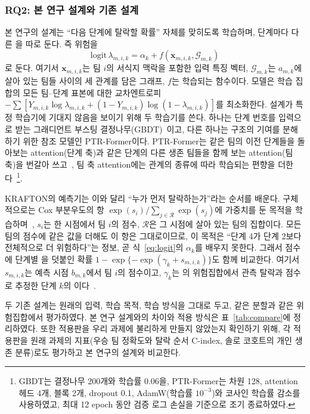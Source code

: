 \subsubsection{RQ2: 본 연구 설계와 기존 설계}
\label{sec:method:rq2}
본 연구의 설계는 “다음 단계에 탈락할 확률” 자체를 맞히도록 학습하며, 단계마다 다른 을 따로 둔다.
즉 위험을
\begin{equation}
\mathrm{logit}\,\lambda_{m,i,k}=\alpha_k+f(\mathbf{x}_{m,i,k},\mathcal{G}_{m,k})
\label{eq:logit}
\end{equation}
로 둔다. 여기서 $\mathbf{x}_{m,i,k}$는 팀 $i$의 서식지 맥락을 포함한 입력 특징 벡터, $\mathcal{G}_{m,k}$는 $a_{m,k}$에 살아 있는 팀들 사이의 세 관계를 담은 그래프, $f$는 학습되는 함수이다.
모델은 학습 집합의 모든 팀--단계 표본에 대한 교차엔트로피 $-\sum[Y_{m,i,k}\log\lambda_{m,i,k}+(1-Y_{m,i,k})\log(1-\lambda_{m,i,k})]$를 최소화한다. 
설계가 특정 학습기에 기대지 않음을 보이기 위해 두 학습기를 쓴다.
하나는 단계 번호를 입력으로 받는 그래디언트 부스팅 결정나무(GBDT)~\cite{Friedman01}이고, 다른 하나는 구조의 기여를 분해하기 위한 참조 모델인 PTR-Former이다.
PTR-Former는 같은 팀의 이전 단계들을 돌아보는 attention(단계 축)과 같은 단계의 다른 생존 팀들을 함께 보는 attention(팀 축)을 번갈아 쓰고~\cite{Vaswani17}, 팀 축 attention에는 관계의 종류에 따라 학습되는 편향을 더한다~\cite{Ying21}\footnote{GBDT는 결정나무 200개와 학습률 0.06을, PTR-Former는 차원 128, attention 헤드 4개, 블록 2개, dropout 0.1, AdamW(학습률 $10^{-3}$)와 코사인 학습률 감소를 사용하였고, 최대 12 epoch 동안 검증 로그 손실을 기준으로 조기 종료하였다. }.

KRAFTON의 예측기는 이와 달리 “누가 먼저 탈락하는가”라는 순서를 배운다.
구체적으로는 Cox 부분우도의 항 $\exp(s_i)/\sum_{j\in\mathcal{R}}\exp(s_j)$에 가중치를 둔 목적을 학습하며~\cite{Cox72}, $s_i$는 한 시점에서 팀 $i$의 점수, $\mathcal{R}$은 그 시점에 살아 있는 팀의 집합이다.
모든 팀의 점수에 같은 값을 더해도 이 항은 그대로이므로, 이 목적은 “단계 4가 단계 2보다 전체적으로 더 위험하다”는 정보, 곧 식~\eqref{eq:logit}의 $\alpha_k$를 배우지 못한다.
그래서 점수에 단계별 을 덧붙인 확률 $1-\exp\{-\exp(\gamma_k+s_{m,i,k})\}$도 함께 비교한다. 여기서 $s_{m,i,k}$는 예측 시점 $b_{m,k}$에서 팀 $i$의 점수이고, $\gamma_k$는 의 위험집합에서 관측 탈락과 점수로 추정한 단계 $k$의 이다~\cite{PrenticeGloeckler78}.

두 기존 설계는 원래의 입력, 학습 목적, 학습 방식을 그대로 두고, 같은 분할과 같은 위험집합에서 평가하였다. 본 연구 설계와의 차이와 적용 방식은 표~\ref{tab:compare}에 정리하였다.
또한 적용판을 우리 과제에 불리하게 만들지 않았는지 확인하기 위해, 각 적용판을 원래 과제의 지표(우승 팀 정확도와 탈락 순서 C-index, 솔로 코호트의 개인 생존 분류)로도 평가하고 본 연구의 설계와 비교한다.

